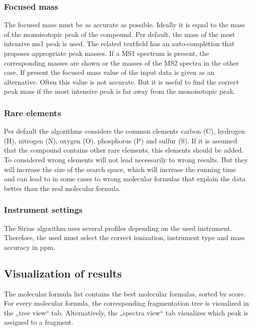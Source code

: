 \documentclass[a4paper,11pt]{article}
\begin{document}
 \subsubsection{Focused mass}
 
 The focused mass must be as accurate as possible. Ideally it is equal to the mass of the monoisotopic peak of the compound. Per default, 
 the mass of the most intensive ms1 peak is used. The related textfield has an auto-completion that proposes appropriate peak masses. 
 If a MS1 spectrum is present, the corresponding masses are shown or the masses of the MS2 spectra in the other case.  
 If present the focused mass value of the input data is given as an alternative.  Often this value is not accurate. 
 But it is useful to find the correct peak mass if the most intensive peak is far away from the monoisotopic peak.
 
 \subsubsection{Rare elements}
 
 Per default the algorithms considers the common elements carbon (C), hydrogen (H), nitrogen (N), oxygen (O), phosphorus (P) and sulfur (S). 
 If it is assumed that the compound contains other rare elements, this elements should be added. To considered wrong elements will not lead necessarily 
 to wrong results. But they will increase the size of the search space, which will increase the running time and can lead to in some cases 
 to wrong molecular formulas that explain the data better than the real molecular formula.
 
 \subsubsection{Instrument settings}
 
 The Sirius algorithm uses several profiles depending on the used instrument. 
 Therefore, the used must select the correct ionization, instrument type  and mass accuracy in ppm.
 
 \subsection{Visualization of results}
 
 
 The molecular formula list contains the best molecular formulas, sorted by score. For every molecular formula, 
 the corresponding fragmentation tree is visualized in the „tree view“ tab. Alternatively, the „spectra view“ 
 tab visualizes which peak is assigned to a fragment.
 
\end{document}
